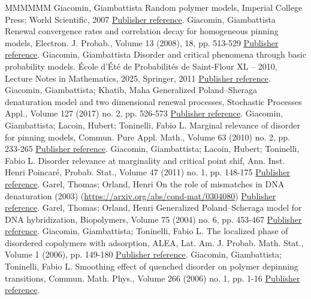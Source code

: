 \begin{thebibliography}{MMMMMM}
 Giacomin, Giambattista Random polymer models, Imperial College Press; World Scientific, 2007 \href{https://ahl.centre-mersenne.org/item/AHL_2020__3__299_0/#cf:GB}{Publisher reference}.
 Giacomin, Giambattista Renewal convergence rates and correlation decay for homogeneous pinning models, Electron. J. Probab., Volume 13 (2008), 18, pp. 513-529 \href{https://ahl.centre-mersenne.org/item/AHL_2020__3__299_0/#cf:G08}{Publisher reference}.
 Giacomin, Giambattista Disorder and critical phenomena through basic probability models. École d’Été de Probabilités de Saint-Flour XL – 2010, Lecture Notes in Mathematics, 2025, Springer, 2011 \href{https://ahl.centre-mersenne.org/item/AHL_2020__3__299_0/#cf:G}{Publisher reference}.
 Giacomin, Giambattista; Khatib, Maha Generalized Poland–Sheraga denaturation model and two dimensional renewal processes, Stochastic Processes Appl., Volume 127 (2017) no. 2, pp. 526-573 \href{https://ahl.centre-mersenne.org/item/AHL_2020__3__299_0/#cf:GK}{Publisher reference}.
 Giacomin, Giambattista; Lacoin, Hubert; Toninelli, Fabio L. Marginal relevance of disorder for pinning models, Commun. Pure Appl. Math., Volume 63 (2010) no. 2, pp. 233-265 \href{https://ahl.centre-mersenne.org/item/AHL_2020__3__299_0/#cf:1GLT10}{Publisher reference}.
 Giacomin, Giambattista; Lacoin, Hubert; Toninelli, Fabio L. Disorder relevance at marginality and critical point shif, Ann. Inst. Henri Poincaré, Probab. Stat., Volume 47 (2011) no. 1, pp. 148-175 \href{https://ahl.centre-mersenne.org/item/AHL_2020__3__299_0/#cf:GLT11}{Publisher reference}.
 Garel, Thomas; Orland, Henri On the role of mismatches in DNA denaturation (2003) (\url{https://arxiv.org/abs/cond-mat/0304080}) \href{https://ahl.centre-mersenne.org/item/AHL_2020__3__299_0/#cf:GOO}{Publisher reference}.
 Garel, Thomas; Orland, Henri Generalized Poland–Scheraga model for DNA hybridization, Biopolymers, Volume 75 (2004) no. 6, pp. 453-467 \href{https://ahl.centre-mersenne.org/item/AHL_2020__3__299_0/#cf:GO04}{Publisher reference}.
 Giacomin, Giambattista; Toninelli, Fabio L. The localized phase of disordered copolymers with adsorption, ALEA, Lat. Am. J. Probab. Math. Stat., Volume 1 (2006), pp. 149-180 \href{https://ahl.centre-mersenne.org/item/AHL_2020__3__299_0/#cf:GTalea}{Publisher reference}.
 Giacomin, Giambattista; Toninelli, Fabio L. Smoothing effect of quenched disorder on polymer depinning transitions, Commun. Math. Phys., Volume 266 (2006) no. 1, pp. 1-16 \href{https://ahl.centre-mersenne.org/item/AHL_2020__3__299_0/#cf:GT06}{Publisher reference}.

\end{thebibliography}
